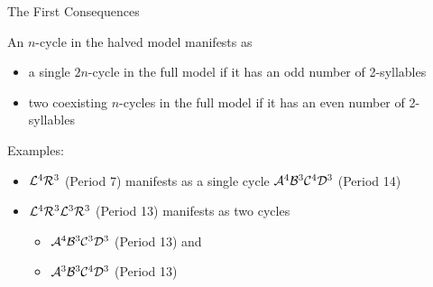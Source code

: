 \begin{frame}{The First Consequences}
	\begin{theorem}
		An $n$-cycle in the halved model manifests as
		\begin{itemize}
			\item a single $2n$-cycle in the full model if it has an odd number of 2-syllables
			\item two coexisting $n$-cycles in the full model if it has an even number of 2-syllables
		\end{itemize}
	\end{theorem}
	\pause
	Examples:
	\begin{itemize}
		\item $\mathcal{L}^4\mathcal{R}^3$ (Period 7) manifests as a single cycle $\mathcal{A}^4\mathcal{B}^3\mathcal{C}^4\mathcal{D}^3$ (Period 14)
		\item $\mathcal{L}^4\mathcal{R}^3\mathcal{L}^3\mathcal{R}^3$ (Period 13) manifests as two cycles
		      \begin{itemize}
			      \item $\mathcal{A}^4\mathcal{B}^3\mathcal{C}^3\mathcal{D}^3$ (Period 13) and
			      \item $\mathcal{A}^3\mathcal{B}^3\mathcal{C}^4\mathcal{D}^3$ (Period 13)
		      \end{itemize}
	\end{itemize}
\end{frame}

